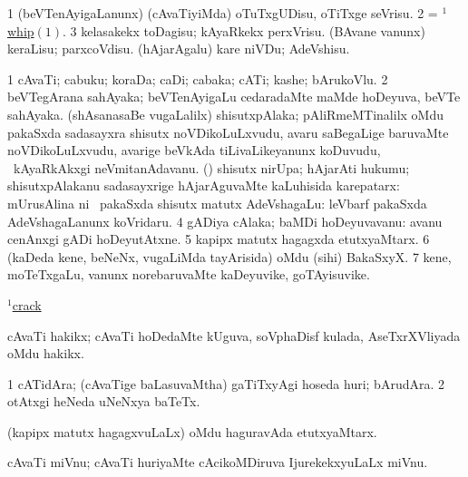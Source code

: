 \noindent 
\gl{\pagu}
\expl{}
\bmng
\bnum
\num{1}  (beVTenAyigaLanunx) (cAvaTiyiMda) oTuTxgUDisu, oTiTxge seVrisu. 
\num{2}  = \hyperlink{whip(1)}{$^1$whip\((1)\)}. 
\num{3}  kelasakekx toDagisu; kAyaRkekx perxVrisu. 
  
\banum
{} (BAvane \mo vanunx) keraLisu; parxcoVdisu. 
 (hAjarAgalu) kare niVDu; AdeVshisu. 
\eanum
\numie
\enum
\emng
\eentry

\bentry
{} 
\gl{\nA}
\expl{}
\bmng
\bnum
\num{1} cAvaTi; cabuku; koraDa; caDi; cabaka; cATi; kashe; bArukoVlu. 
\num{2} beVTegArana sahAyaka; beVTenAyigaLu cedaradaMte maMde hoDeyuva, beVTe sahAyaka. 
 (shAsanasaBe \mo vugaLalilx) 
\banum
{} shisutxpAlaka; pAliRmeMTinalilx oMdu pakaSxda sadasayxra shisutx noVDikoLuLxvudu, avaru saBegaLige baruvaMte noVDikoLuLxvudu, avarige beVkAda tiLivaLikeyanunx koDuvudu, \mo\ kAyaRkAkxgi neVmitanAdavanu. 
 (\birx) shisutx nirUpa; hAjarAti hukumu; shisutxpAlakanu sadasayxrige hAjarAguvaMte kaLuhisida karepatarx:  mUrusAlina ni\rUpa\ 
 pakaSxda shisutx matutx AdeVshagaLu:  leVbarf pakaSxda AdeVshagaLanunx koVridaru. 
\eanum
\numie
\num{4} gADiya cAlaka; baMDi hoDeyuvavanu:  avanu cenAnxgi gADi hoDeyutAtxne. 
\num{5} kapipx matutx hagagxda etutxyaMtarx. 
\num{6} (kaDeda kene, beNeNx, \mo vugaLiMda tayArisida) oMdu (sihi) BakaSxyX. 
\num{7} kene, moTeTxgaLu, \mo vanunx norebaruvaMte kaDeyuvike, goTAyisuvike. 
\enum
\emng

\noindent
\gl{\pagu}
\expl{}
\bmng
{} \hyperref{kandict_c.pdf}{C}{crac(1) nuga(3)}{$^1$crack}  
\emng
\eentry

\bentry
{} 
\gl{\nA}
\expl{}
\bmng
cAvaTi hakikx; cAvaTi hoDedaMte kUguva, soVphaDisf  kulada, AseTxrXVliyada oMdu hakikx. 
\emng
\eentry

\bentry
{} 
\gl{\nA}
\expl{}
\bmng
\bnum
\num{1} cATidAra; (cAvaTige baLasuvaMtha) gaTiTxyAgi hoseda huri; bArudAra. 
\num{2} otAtxgi heNeda uNeNxya baTeTx. 
\enum
\emng
\eentry

\bentry
{} 
\gl{\nA}
\expl{}
\bmng
(kapipx matutx hagagxvuLaLx) oMdu haguravAda etutxyaMtarx. 
\emng
\eentry

\bentry
{} 
\gl{\nA}
\expl{}
\bmng
cAvaTi miVnu; cAvaTi huriyaMte cAcikoMDiruva IjurekekxyuLaLx miVnu. 
\emng
\eentry

